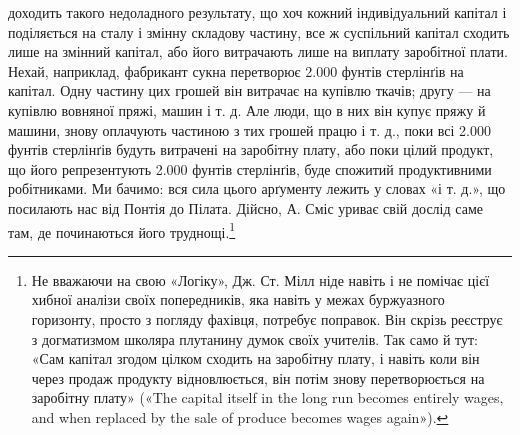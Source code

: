 доходить такого недоладного результату, що хоч кожний індивідуальний
капітал і поділяється на сталу і змінну складову
частину, все ж суспільний капітал сходить лише на змінний
капітал, або його витрачають лише на виплату заробітної плати.
Нехай, наприклад, фабрикант сукна перетворює 2.000 фунтів стерлінґів
на капітал. Одну частину цих грошей він витрачає на купівлю
ткачів; другу — на купівлю вовняної пряжі, машин і т. д.
Але люди, що в них він купує пряжу й машини, знову оплачують
частиною з тих грошей працю і т. д., поки всі 2.000 фунтів
стерлінґів будуть витрачені на заробітну плату, або поки
цілий продукт, що його репрезентують 2.000 фунтів стерлінґів,
буде спожитий продуктивними робітниками. Ми бачимо: вся
сила цього арґументу лежить у словах «і т. д.», що посилають
нас від Понтія до Пілата. Дійсно, А. Сміс уриває свій дослід
саме там, де починаються його труднощі.\footnote{
Не вважаючи на свою «Логіку», Дж. Ст. Мілл ніде навіть і не
помічає цієї хибної аналізи своїх попередників, яка навіть у межах буржуазного
горизонту, просто з погляду фахівця, потребує поправок. Він
скрізь реєструє з догматизмом школяра плутанину думок своїх учителів.
Так само й тут: «Сам капітал згодом цілком сходить на заробітну плату,
і навіть коли він через продаж продукту відновлюється, він потім знову
перетворюється на заробітну плату» («The capital itself in the long run
becomes entirely wages, and when replaced by the sale of produce becomes
wages again»).
}

